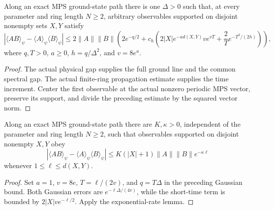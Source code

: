 \begin{lemma}
    \label{cor:spt_exact_ground_connected_gaussian_bound}
    \leanok
    Along an exact MPS ground-state path there is one $\Delta>0$ such that,
    at every parameter and ring length $N\ge2$, arbitrary observables
    supported on disjoint nonempty sets $X,Y$ satisfy
    \[
        |\langle AB\rangle_\psi
        -\langle A\rangle_\psi\langle B\rangle_\psi|
        \le2\|A\|\|B\|
        \left(2e^{-q/2}+c_h\left(
            2|X|e^{-a d(X,Y)}ve^{vT}
            +\frac2T e^{-T^2/(2h)}\right)\right),
    \]
    where $q,T>0$, $a\ge0$, $h=q/\Delta^2$, and $v=8e^a$.
\end{lemma}
\begin{proof}\leanok
    The actual physical gap supplies the full ground line and the common
    spectral gap. The actual finite-ring propagation estimate supplies
    the time increment. Center the first observable at the actual
    nonzero periodic MPS vector, preserve its support, and divide the
    preceding estimate by the squared vector norm.
\end{proof}

\begin{lemma}
    \label{thm:spt_exact_ground_connected_exponential_clustering}
    \leanok
    Along an exact MPS ground-state path there are $K,\kappa>0$,
    independent of the parameter and ring length $N\ge2$, such that
    observables supported on disjoint nonempty $X,Y$ obey
    \[
        |\langle AB\rangle_\psi
        -\langle A\rangle_\psi\langle B\rangle_\psi|
        \le K(|X|+1)\|A\|\|B\|e^{-\kappa\ell}
    \]
    whenever $1\le\ell\le d(X,Y)$.
\end{lemma}
\begin{proof}\leanok
    Set $a=1$, $v=8e$, $T=\ell/(2v)$, and $q=T\Delta$ in the
    preceding Gaussian bound. Both Gaussian errors are
    $e^{-\ell\Delta/(4v)}$, while the short-time term is bounded
    by $2|X|v e^{-\ell/2}$. Apply the exponential-rate lemma.
\end{proof}

